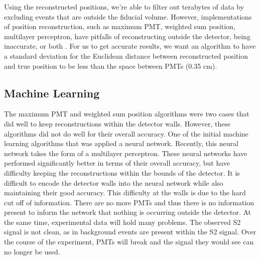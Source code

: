\par Using the reconstructed positions, we're able to filter out terabytes of data by excluding events that are outside the fiducial volume.
However, implementations of position reconstruction, such as maximum PMT, weighted sum position, multilayer perceptron, have pitfalls of reconstructing outside the detector, being inaccurate, or both \cite{Bart}.
For us to get accurate results, we want an algorithm to have a standard deviation for the Euclidean distance between reconstructed position and true position to be less than the space between PMTs (0.35 cm).
\subsection{Machine Learning}
The maximum PMT and weighted sum position algorithms were two cases that did well to keep reconstructions within the detector walls.
However, these algorithms did not do well for their overall accuracy.
One of the initial machine learning algorithms that was applied a neural network.
Recently, this neural network takes the form of a multilayer perceptron.
These neural networks have performed significantly better in terms of their overall accuracy, but have difficulty keeping the reconstructions within the bounds of the detector.
It is difficult to encode the detector walls into the neural network while also maintaining their good accuracy.
This difficulty at the walls is due to the hard cut off of information.
There are no more PMTs and thus there is no information present to inform the network that nothing is occurring outside the detector.
At the same time, experimental data will hold many problems.
The observed S2 signal is not clean, as in background events are present within the S2 signal.
Over the course of the experiment, PMTs will break and the signal they would see can no longer be used.
